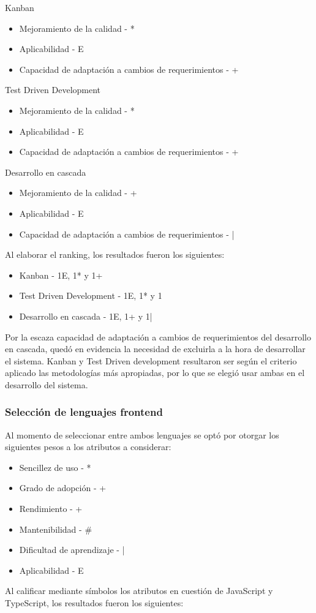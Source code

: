 \documentclass[twoside]{article}
\begin{document}
Kanban
\begin{itemize}
    \item Mejoramiento de la calidad - *
    \item Aplicabilidad - E
    \item Capacidad de adaptación a cambios de requerimientos - +
\end{itemize}
Test Driven Development
\begin{itemize}
    \item Mejoramiento de la calidad - *
    \item Aplicabilidad - E
    \item Capacidad de adaptación a cambios de requerimientos - +
\end{itemize}
Desarrollo en cascada
\begin{itemize}
    \item Mejoramiento de la calidad - +
    \item Aplicabilidad - E
    \item Capacidad de adaptación a cambios de requerimientos - |
\end{itemize}
Al elaborar el ranking, los resultados fueron los siguientes:
\begin{itemize}
    \item Kanban - 1E, 1* y 1+
    \item Test Driven Development - 1E, 1* y 1
    \item Desarrollo en cascada - 1E, 1+ y 1|
\end{itemize}
Por la escaza capacidad de adaptación a cambios de requerimientos del desarrollo en cascada, quedó en evidencia la necesidad de excluirla a la hora de desarrollar el sistema. Kanban y Test Driven development resultaron ser según el criterio aplicado las metodologías más apropiadas, por lo que se elegió usar ambas en el desarrollo del sistema.
\subsubsection{Selección de lenguajes frontend}
Al momento de seleccionar entre ambos lenguajes se optó por otorgar los siguientes pesos a los atributos a considerar:
\begin{itemize}
    \item Sencillez de uso - *
    \item Grado de adopción - +
    \item Rendimiento - +
    \item Mantenibilidad - \#
    \item Dificultad de aprendizaje - |
    \item Aplicabilidad - E
\end{itemize}
Al calificar mediante símbolos los atributos en cuestión de JavaScript y TypeScript, los resultados fueron los siguientes:
\end{document}

